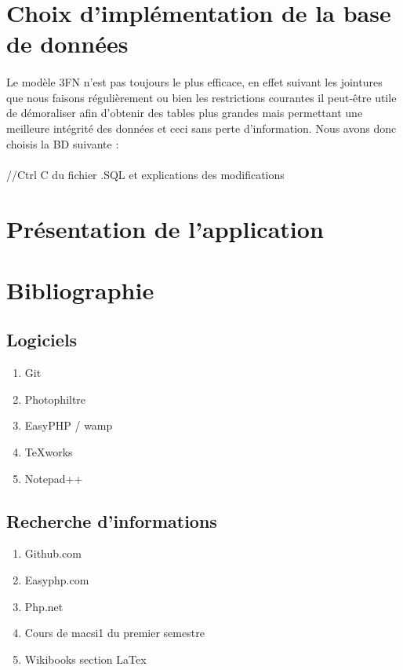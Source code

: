 \documentclass[a4paper, 12pt]{article}
\begin{document}
\section{Choix d'implémentation de la base de données}
\paragraph{}Le modèle 3FN n'est pas toujours le plus efficace, en effet suivant les jointures que nous faisons régulièrement ou bien les restrictions courantes il peut-être utile de démoraliser afin d'obtenir des tables plus grandes mais permettant une meilleure intégrité des données et ceci sans perte d'information. Nous avons donc choisis la BD suivante :
\\ \\
//Ctrl C du fichier .SQL et explications des modifications

\newpage

\section{Présentation de l'application}


\newpage

\section{Bibliographie}
\subsection{Logiciels}
\begin{enumerate}
	\item Git
	\item Photophiltre
	\item EasyPHP / wamp
	\item TeXworks
	\item Notepad++
\end{enumerate}

\subsection{Recherche d’informations}
\begin{enumerate}
	\item Github.com
	\item Easyphp.com
	\item Php.net
	\item Cours de macsi1 du premier semestre
	\item Wikibooks section LaTex
\end{enumerate}
\end{document}
